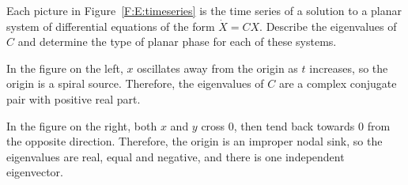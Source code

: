\documentclass{ximera}
\begin{document}
\begin{exercise} \label{c6.8.3}
Each picture in Figure~\ref{F:E:timeseries} is the time series of a
solution to a planar system of differential equations of the form
$\dot{X}=CX$.  Describe the eigenvalues of $C$ and determine the type
of planar phase for each of these systems.

\begin{solution}

In the figure on the left, $x$ oscillates away from the origin as $t$
increases, so the origin is a spiral source.  Therefore, the eigenvalues
of $C$ are a complex conjugate pair with positive real part.

\para In the figure on the right, both $x$ and $y$ cross $0$, then
tend back towards $0$ from the opposite direction.  Therefore, the origin
is an improper nodal sink, so the eigenvalues are real, equal and
negative, and there is one independent eigenvector.

\end{solution}
\end{exercise}
\begin{figure*}[htb]
        \centerline{%
        }
	\caption{Time series for planar systems.}
	\label{F:E:timeseries}
\end{figure*}


\CEXER
\end{document}
